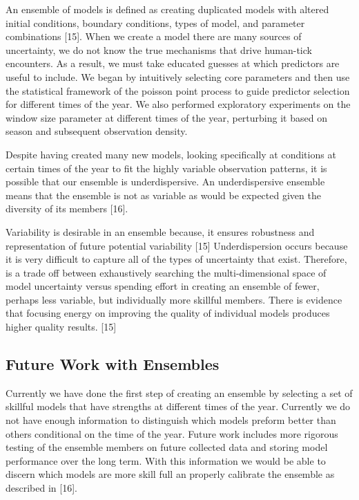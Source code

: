 \noindent An ensemble of models is defined as creating duplicated models with altered initial conditions, boundary conditions, types of model, and parameter combinations [15]. When we create a model there are many sources of uncertainty, we do not know the true mechanisms that drive human-tick encounters. As a result, we must take educated guesses at which predictors are useful to include. We began by intuitively selecting core parameters and then use the statistical framework of the poisson point process to guide predictor selection for different times of the year.  We also performed exploratory experiments on the window size parameter at different times of the year, perturbing it based on season and subsequent observation density.  \newline

\noindent Despite having created many new models, looking specifically at conditions at certain times of the year to fit the highly variable observation patterns, it is possible that our ensemble is underdispersive. An underdispersive ensemble means that the ensemble is not as variable as would be expected given the diversity of its members [16]. \newline

\noindent Variability is desirable in an ensemble because, it ensures robustness and representation of future potential variability [15] Underdispersion occurs because it is very difficult to capture all of the types of uncertainty that exist. Therefore, is a trade off between exhaustively searching the multi-dimensional space of model uncertainty versus spending effort in creating an ensemble of fewer, perhaps less variable, but individually more skillful members. There is evidence that focusing energy on improving the quality of individual models produces higher quality results. [15]


\subsection{Future Work with Ensembles}
 
Currently we have done the first step of creating an ensemble by selecting a set of skillful models that have strengths at different times of the year. Currently we do not have enough information to distinguish which models preform better than others conditional on the time of the year. Future work includes more rigorous testing of the ensemble members on future collected data and storing model performance over the long term. With this information we would be able to discern which models are more skill full an properly calibrate the ensemble as described in [16]. 


